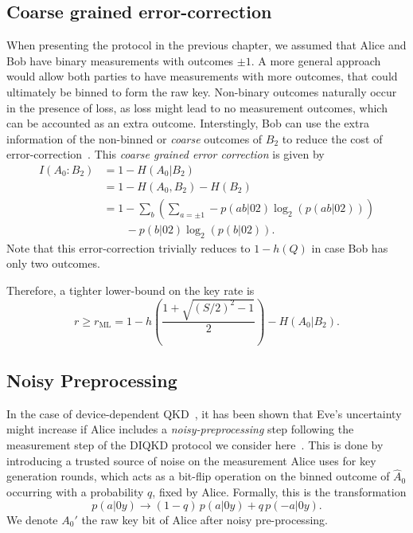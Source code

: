 \subsection{Coarse grained error-correction}

When presenting the protocol in the previous chapter, we assumed that Alice and Bob have binary measurements with outcomes $\pm 1$.
A more general approach would allow both parties to have measurements with more outcomes, that could ultimately be binned to form the raw key.
Non-binary outcomes naturally occur in the presence of loss, as loss might lead to no measurement outcomes, which can be accounted as an extra outcome.
Interstingly, Bob can use the extra information of the non-binned or \textit{coarse} outcomes of $B_2$ to reduce the cost of error-correction~\cite{Ma2012}.
This \textit{coarse grained error correction} is given by
\begin{equation}
	\begin{split}
		I(A_0 : B_2) &= 1-H(A_0|B_2) \\
					 &= 1-H(A_0,B_2) - H(B_2) \\
					 &= 1-\sum_b \left( \sum_{a = \pm1} -p(ab|02)\log_2(p(ab|02)) \right) \\
					 &\qquad - p(b|02)\log_2(p(b|02)).
	\end{split}
	\label{eq:Ma}
\end{equation}
Note that this error-correction trivially reduces to $1-h(Q)$ in case Bob has only two outcomes.

Therefore, a tighter lower-bound on the key rate is
\begin{equation}
	r \geq r_\mathrm{ML} = 1 - h\left(\frac{1+\sqrt{(S/2)^2-1}}{2} \right) - H(A_0|B_2).
	\label{eq:Makr}
\end{equation}


\subsection{Noisy Preprocessing}

In the case of device-dependent QKD~\cite{Renner2005,Kraus2005,Renes2007}, it has been shown that Eve's uncertainty might increase if Alice includes a \textit{noisy-preprocessing} step following the measurement step of the DIQKD protocol we consider here~\cite{Ho2020}.
This is done by introducing a trusted source of noise on the measurement Alice uses for key generation rounds, which acts as a bit-flip operation on the binned outcome of $\hat{A}_0$ occurring with a probability $q$, fixed by Alice.
Formally, this is the transformation
\begin{equation}
	p(a|0y) \rightarrow (1-q)\,p(a|0y) + q\, p(-a|0y).
\end{equation}
We denote $A_0'$ the raw key bit of Alice after noisy pre-processing.

